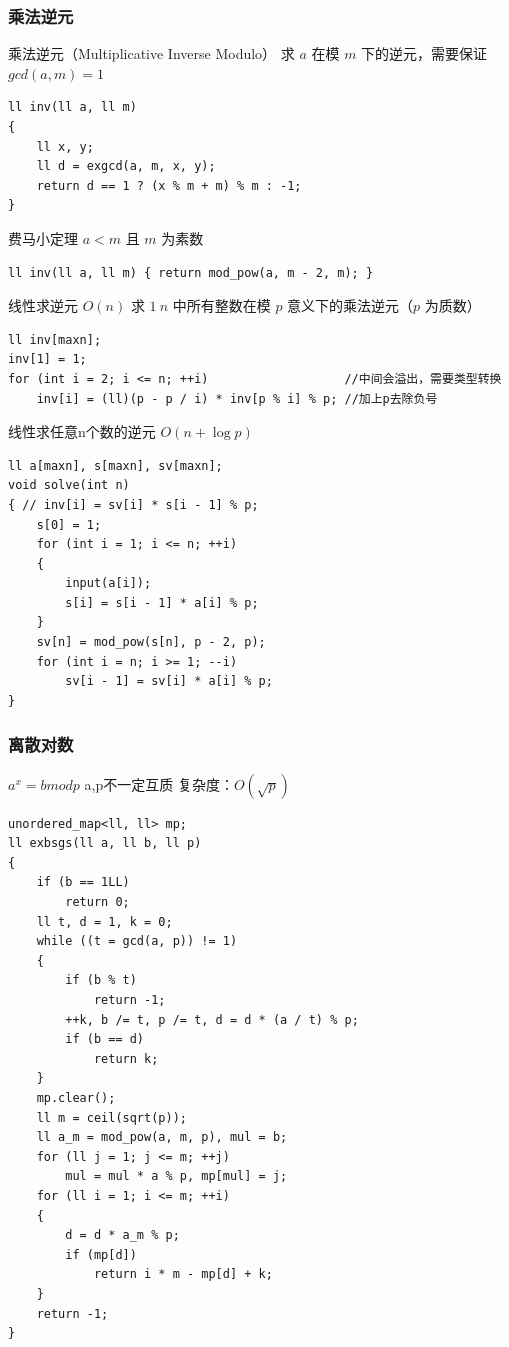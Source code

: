 \documentclass[twoside]{article}
\begin{document}
\subsubsection{乘法逆元}
乘法逆元（Multiplicative Inverse Modulo）
求 $a$ 在模 $m$ 下的逆元，需要保证 $gcd(a,m)=1$
\begin{lstlisting}
ll inv(ll a, ll m)
{
    ll x, y;
    ll d = exgcd(a, m, x, y);
    return d == 1 ? (x % m + m) % m : -1;
}
\end{lstlisting}
费马小定理 $a<m$ 且 $m$ 为素数
\begin{lstlisting}
ll inv(ll a, ll m) { return mod_pow(a, m - 2, m); }
\end{lstlisting}
线性求逆元 $O(n)$
求 $1~n$ 中所有整数在模 $p$ 意义下的乘法逆元（$p$ 为质数）
\begin{lstlisting}
ll inv[maxn];
inv[1] = 1;
for (int i = 2; i <= n; ++i)                   //中间会溢出，需要类型转换
    inv[i] = (ll)(p - p / i) * inv[p % i] % p; //加上p去除负号
\end{lstlisting}
线性求任意n个数的逆元 $O(n + \log p)$
\begin{lstlisting}
ll a[maxn], s[maxn], sv[maxn];
void solve(int n)
{ // inv[i] = sv[i] * s[i - 1] % p;
    s[0] = 1;
    for (int i = 1; i <= n; ++i)
    {
        input(a[i]);
        s[i] = s[i - 1] * a[i] % p;
    }
    sv[n] = mod_pow(s[n], p - 2, p);
    for (int i = n; i >= 1; --i)
        sv[i - 1] = sv[i] * a[i] % p;
}
\end{lstlisting}
\subsubsection{离散对数}
$a^x = b mod p$  a,p不一定互质
复杂度：$O(\sqrt{p})$
\begin{lstlisting}
unordered_map<ll, ll> mp;
ll exbsgs(ll a, ll b, ll p)
{
    if (b == 1LL)
        return 0;
    ll t, d = 1, k = 0;
    while ((t = gcd(a, p)) != 1)
    {
        if (b % t)
            return -1;
        ++k, b /= t, p /= t, d = d * (a / t) % p;
        if (b == d)
            return k;
    }
    mp.clear();
    ll m = ceil(sqrt(p));
    ll a_m = mod_pow(a, m, p), mul = b;
    for (ll j = 1; j <= m; ++j)
        mul = mul * a % p, mp[mul] = j;
    for (ll i = 1; i <= m; ++i)
    {
        d = d * a_m % p;
        if (mp[d])
            return i * m - mp[d] + k;
    }
    return -1;
}
\end{lstlisting}
\end{document}
